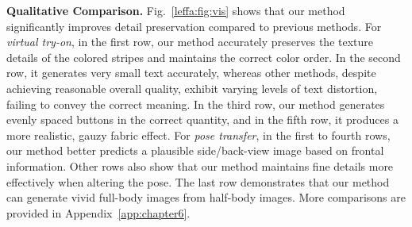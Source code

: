 \begin{table}[!t]
\centering
\setlength{\tabcolsep}{0.2cm}
\caption{Quantitative results comparison with other methods on the DressCode dataset (all garment categories) for virtual try-on. 
}
\label{leffa:tab:dresscode}
\end{table}


\noindent \textbf{Qualitative Comparison.}
Fig.~\ref{leffa:fig:vis} shows that our method significantly improves detail preservation compared to previous methods.
For \textit{virtual try-on}, in the first row, our method accurately preserves the texture details of the colored stripes and maintains the correct color order.
In the second row, it generates very small text accurately, whereas other methods, despite achieving reasonable overall quality, exhibit varying levels of text distortion, failing to convey the correct meaning.
In the third row, our method generates evenly spaced buttons in the correct quantity, and in the fifth row, it produces a more realistic, gauzy fabric effect.
For \textit{pose transfer}, in the first to fourth rows, our method better predicts a plausible side/back-view image based on frontal information.
Other rows also show that our method maintains fine details more effectively when altering the pose.
The last row demonstrates that our method can generate vivid full-body images from half-body images.
More comparisons are provided in Appendix~\ref{app:chapter6}.


